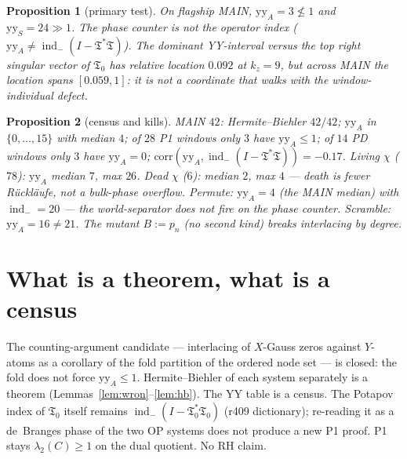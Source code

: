 \documentclass[11pt]{article}
\newtheorem{prop}{Proposition}
\theoremstyle{remark}
\newcommand{\Tfrak}{\mathfrak{T}}
\newcommand{\indm}{\operatorname{ind}_{-}}
\begin{document}
\begin{prop}[primary test]\label{prop:primary}
On flagship MAIN, $\mathrm{yy}_A=3\not\le 1$ and
$\mathrm{yy}_S=24\gg 1$.
The phase counter is not the operator index
($\mathrm{yy}_A\neq \indm(I-\Tfrak^*\Tfrak)$).
The dominant YY-interval versus the top right singular
vector of $\Tfrak_0$ has relative location $0.092$ at
$k_z=9$, but across MAIN the location spans $[0.059,1]$:
it is not a coordinate that walks with the window-individual
defect.
\end{prop}

\begin{prop}[census and kills]\label{prop:census}
MAIN $42$: Hermite--Biehler $42/42$; $\mathrm{yy}_A$ in
$\{0,\ldots,15\}$ with median $4$; of $28$ P1 windows only
$3$ have $\mathrm{yy}_A\le 1$; of $14$ PD windows only $3$
have $\mathrm{yy}_A=0$;
$\mathrm{corr}(\mathrm{yy}_A,\indm(I-\Tfrak^*\Tfrak))=-0.17$.
Living $\chi$ ($78$): $\mathrm{yy}_A$ median $7$, max $26$.
Dead $\chi$ ($6$): median $2$, max $4$ --- death is
\emph{fewer} R\"uckl\"aufe, not a bulk-phase overflow.
Permute: $\mathrm{yy}_A=4$ (the MAIN median) with
$\indm=20$ --- the world-separator does not fire on the
phase counter.
Scramble: $\mathrm{yy}_A=16\neq 21$.
The mutant $B:=p_n$ (no second kind) breaks interlacing
by degree.
\end{prop}

\section{What is a theorem, what is a census}\label{sec:honest}

The counting-argument candidate --- interlacing of $X$-Gauss
zeros against $Y$-atoms as a corollary of the fold partition
of the ordered node set --- is closed: the fold does not
force $\mathrm{yy}_A\le 1$.
Hermite--Biehler of each system separately is a theorem
(Lemmas~\ref{lem:wron}--\ref{lem:hb}).
The YY table is a census.
The Potapov index of $\Tfrak_0$ itself remains
$\indm(I-\Tfrak_0^*\Tfrak_0)$ (r409 dictionary); re-reading
it as a de~Branges phase of the two OP systems does not
produce a new P1 proof.
P1 stays $\lambda_2(C)\ge 1$ on the dual quotient.
No RH claim.
\end{document}
